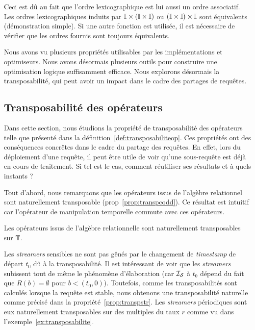 Ceci est dû au fait que l'ordre lexicographique est lui aussi un ordre associatif. Les ordres lexicographiques induits par $\mathbb{I}\times(\mathbb{I}\times\mathbb{I})$ ou $(\mathbb{I}\times\mathbb{I})\times \mathbb{I}$ sont équivalents (démonstration simple). Si une autre fonction est utilisée, il est nécessaire de vérifier que les ordres fournis sont toujours équivalents.

Nous avons vu plusieurs propriétés utilisables par les implémentations et optimiseurs. Nous avons désormais plusieurs outils pour construire une optimisation logique suffisamment efficace. Nous explorons désormais la transposabilité, qui peut avoir un impact dans le cadre des partages de requêtes.

\subsection{Transposabilité des opérateurs}
Dans cette section, nous étudions la propriété de transposabilité des opérateurs telle que présenté dans la définition~\ref{def:transposabiliteop}. Ces propriétés ont des conséquences concrêtes dans le cadre du partage des requêtes. En effet, lors du déploiement d'une requête, il peut être utile de voir qu'une sous-requête est déjà en cours de traitement. Si tel est le cas, comment réutiliser ses résultats et à quels instants ?

Tout d'abord, nous remarquons que les opérateurs issus de l'algèbre relationnel sont naturellement transposable (prop~\ref{prop:transpcodd}). Ce résultat est intuitif car l'opérateur de manipulation temporelle commute avec ces opérateurs.
\begin{prop}\label{prop:transpcodd}
    Les opérateurs issus de l'algèbre relationnelle sont naturellement transposables sur $\mathbb{T}$.
\end{prop}

Les \textit{streamers} sensibles ne sont pas gênés par le changement de \textit{timestamp} de départ $t_0$ dû à la transposabilité. Il est intéressant de voir que les \textit{streamers} subissent tout de même le phénomène d'élaboration (car $\mathcal{I_S}$ à $t_0$ dépend du fait que $R(b)=\emptyset$ pour $b<(t_0,0)$). Toutefois, comme les transposabilités sont calculés lorsque la requête est stable, nous obtenons une transposabilité naturelle comme précisé dans la propriété~\ref{prop:transpstr}. Les \textit{streamers} périodiques sont eux naturellement transposables sur des multiples du taux $r$ comme vu dans l'exemple~\ref{ex:transposabilite}.

